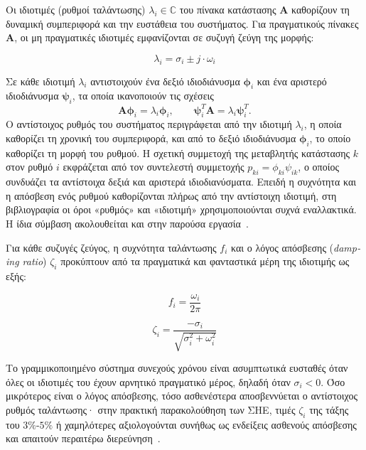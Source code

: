 Οι ιδιοτιμές (ρυθμοί ταλάντωσης) $\lambda_i \in \mathbb{C}$ του πίνακα κατάστασης $\mathbf{A}$ καθορίζουν τη δυναμική συμπεριφορά και την ευστάθεια του συστήματος. Για πραγματικούς πίνακες $\mathbf{A}$, οι μη πραγματικές ιδιοτιμές εμφανίζονται σε συζυγή ζεύγη της μορφής:

\begin{equation}
\lambda_i = \sigma_i \pm j \cdot \omega_i
\label{eq:eigenvalue-pair}
\end{equation}

Σε κάθε ιδιοτιμή $\lambda_i$ αντιστοιχούν ένα δεξιό ιδιοδιάνυσμα $\boldsymbol{\phi}_i$ και ένα αριστερό ιδιοδιάνυσμα $\boldsymbol{\psi}_i$, τα οποία ικανοποιούν τις σχέσεις
\begin{equation}
\mathbf{A}\boldsymbol{\phi}_i=\lambda_i\boldsymbol{\phi}_i,
\qquad
\boldsymbol{\psi}_i^{T}\mathbf{A}=\lambda_i\boldsymbol{\psi}_i^{T}.
\label{eq:left-right-eigenvectors}
\end{equation}
Ο αντίστοιχος ρυθμός του συστήματος περιγράφεται από την ιδιοτιμή $\lambda_i$, η οποία καθορίζει τη χρονική του συμπεριφορά, και από το δεξιό ιδιοδιάνυσμα $\boldsymbol{\phi}_i$, το οποίο καθορίζει τη μορφή του ρυθμού. Η σχετική συμμετοχή της μεταβλητής κατάστασης $k$ στον ρυθμό $i$ εκφράζεται από τον συντελεστή συμμετοχής $p_{ki}=\phi_{ki}\psi_{ik}$, ο οποίος συνδυάζει τα αντίστοιχα δεξιά και αριστερά ιδιοδιανύσματα. Επειδή η συχνότητα και η απόσβεση ενός ρυθμού καθορίζονται πλήρως από την αντίστοιχη ιδιοτιμή, στη βιβλιογραφία οι όροι «ρυθμός» και «ιδιοτιμή» χρησιμοποιούνται συχνά εναλλακτικά. Η ίδια σύμβαση ακολουθείται και στην παρούσα εργασία~\cite{kundur1994,estimation2021,sarkar2024drga}.

Για κάθε συζυγές ζεύγος, η συχνότητα ταλάντωσης $f_i$ και ο λόγος απόσβεσης (\textenglish{\textit{damping ratio}}) $\zeta_i$ προκύπτουν από τα πραγματικά και φανταστικά μέρη της ιδιοτιμής ως εξής:

\begin{equation}
f_i = \frac{\omega_i}{2\pi}
\label{eq:oscillation-frequency}
\end{equation}

\begin{equation}
\zeta_i = \frac{-\sigma_i}{\sqrt{\sigma_i^2 + \omega_i^2}}
\label{eq:damping-ratio}
\end{equation}

Το γραμμικοποιημένο σύστημα συνεχούς χρόνου είναι ασυμπτωτικά ευσταθές όταν όλες οι ιδιοτιμές του έχουν αρνητικό πραγματικό μέρος, δηλαδή όταν $\sigma_i < 0$. Όσο μικρότερος είναι ο λόγος απόσβεσης, τόσο ασθενέστερα αποσβεννύεται ο αντίστοιχος ρυθμός ταλάντωσης· στην πρακτική παρακολούθηση των ΣΗΕ, τιμές $\zeta_i$ της τάξης του $3\%$-$5\%$ ή χαμηλότερες αξιολογούνται συνήθως ως ενδείξεις ασθενούς απόσβεσης και απαιτούν περαιτέρω διερεύνηση~\cite{kundur1994,pai1989}.

